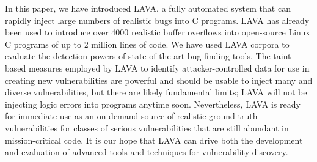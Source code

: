 In this paper, we have introduced LAVA, a fully automated system that can rapidly inject large numbers of realistic bugs into C programs.
LAVA has already been used to introduce over 4000 realistic buffer overflows into open-source Linux C programs of up to 2 million lines of code.  
We have used LAVA corpora to evaluate the detection powers of state-of-the-art bug finding tools.
The taint-based measures employed by LAVA to identify attacker-controlled data for use in creating new vulnerabilities are powerful and should be usable to inject many and diverse vulnerabilities, but there are likely fundamental limits; LAVA will not be injecting logic errors into programs anytime soon.
Nevertheless, LAVA is ready for immediate use as an on-demand source of realistic ground truth vulnerabilities for classes of serious vulnerabilities that are still abundant in mission-critical code.
It is our hope that LAVA can drive both the development and evaluation of advanced tools and techniques for vulnerability discovery.


